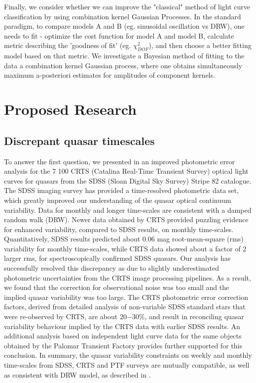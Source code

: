 \documentclass[modern]{aastex62}
\begin{document}
Finally, we consider whether we can improve the "classical" method of light curve classification by using combination kernel Gaussian Processes. In the standard paradigm,  to compare models A and B (eg. sinusoidal oscillation vs DRW), one needs to fit  - optimize the cost function for model A and model B,  calculate metric describing the 'goodness of fit' (eg. $\chi^{2}_{DOF}$), and then choose a better fitting model based on that metric. We investigate a Bayesian method of fitting to the data a combination kernel Gaussian process, where one obtains simultaneously maximum a-posteriori estimates for  amplitudes of component kernels. 

\section{Proposed Research}

\subsection{Discrepant quasar timescales}
To answer the first question, we presented in \cite{suberlak2017} an improved photometric error analysis for the 7 100 CRTS (Catalina Real-Time Transient Survey) optical light curves for quasars from the SDSS (Sloan Digital Sky Survey) Stripe 82 catalogue. The SDSS imaging survey has provided a time-resolved photometric data set, which greatly improved our understanding of the quasar optical continuum variability. Data for monthly and longer time-scales are consistent with a damped random walk (DRW). Newer data obtained by CRTS provided puzzling evidence for enhanced variability, compared to SDSS results, on monthly time-scales. Quantitatively, SDSS results predicted about 0.06 mag root-mean-square (rms) variability for monthly time-scales, while CRTS data showed about a factor of 2 larger rms, for spectroscopically confirmed SDSS quasars. Our analysis has successfully resolved this discrepancy as due to slightly underestimated photometric uncertainties from the CRTS image processing pipelines. As a result, we found that the correction for observational noise was too small and the implied quasar variability was too large. The CRTS photometric error correction factors, derived from detailed analysis of non-variable SDSS standard stars that were re-observed by CRTS, are about $20 \mathrm{-} 30 \%$, and result in reconciling quasar variability behaviour implied by the CRTS data with earlier SDSS results. An additional analysis based on independent light curve data for the same objects obtained by the Palomar Transient Factory provides further supported for this conclusion. In summary, the quasar variability constraints on weekly and monthly time-scales from SDSS, CRTS and PTF surveys are mutually compatible, as well as consistent with DRW model, as described in \cite{suberlak2017}. 
\end{document}
